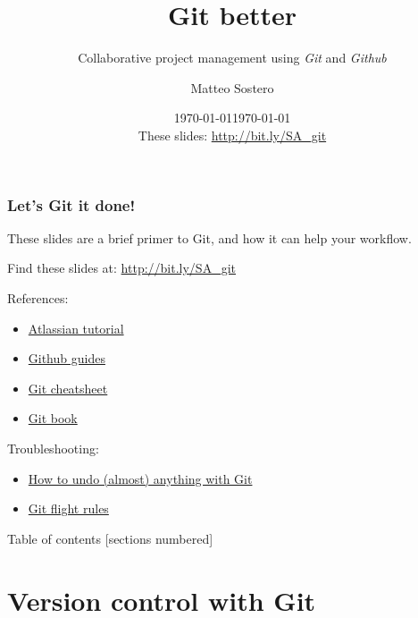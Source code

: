\documentclass[10pt,svgnames,handout]{beamer}
\title{Git better}
\subtitle{Collaborative project management using \emph{Git} and \emph{Github}}
\date{\today}
\author{Matteo Sostero}
\institute{Sant'Anna School of Advanced Studies}
\date{\today\\ These slides: \url{http://bit.ly/SA_git}}
\begin{document}
\maketitle

\begin{frame}
\frametitle{Let's Git it done!}
    
These slides are a brief primer to Git, and how it can help your workflow.

\bigskip

\centerline{Find these slides at: \url{http://bit.ly/SA_git}}

\bigskip
\pause

References:
\begin{itemize}
  \item \href{https://www.atlassian.com/git/tutorials}{Atlassian tutorial}
  \item \href{https://guides.github.com/}{Github guides}
  \item \href{http://ndpsoftware.com/git-cheatsheet.html}{Git cheatsheet}
  \item \href{https://git-scm.com/book/en/v2}{Git book}
\end{itemize}
\medskip

Troubleshooting:
\begin{itemize}
  \item \href{https://github.com/blog/2019-how-to-undo-almost-anything-with-git}{How to undo (almost) anything with Git}
  \item \href{https://github.com/k88hudson/git-flight-rules/blob/master/README.md}{Git flight rules}
\end{itemize}
\end{frame}

\begin{frame}{Table of contents}
[sections numbered]
\tableofcontents[hideallsubsections]
\end{frame}


\section{Version control with Git}
\end{document}

